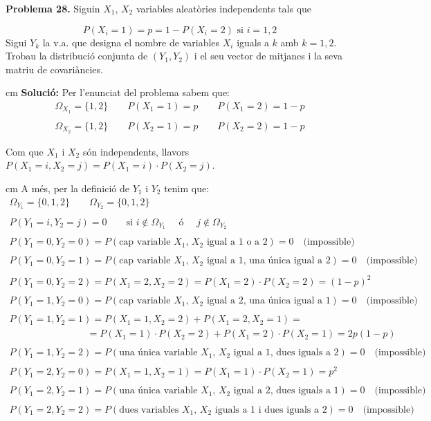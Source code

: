 \documentclass{article}
\begin{document}
\newpage
\noindent
\textbf{Problema 28.}  
Siguin $X_{1}$, $X_{2}$ variables aleat\`ories independents
tals que

$$P(X_{i}=1)=p=1-P(X_{i}=2) \mbox{ si } i=1,2$$ Sigui $Y_{k}$ la
v.a. que designa el nombre de variables $X_{i}$ iguals a $k$ amb
$k=1,2$. Trobau la distribuci\'o conjunta de $(Y_{1},Y_{2})$ i el
seu vector de mitjanes i la seva matriu de covari\`ancies.

 cm
\noindent
\textbf{Soluci\'o:} Per l'enunciat del problema sabem que:
\[
\begin{array}{l}
\Omega_{X_1}=\{ 1, 2 \} \qquad P(X_1=1)=p \qquad P(X_1=2)=1-p
\\
\\
\Omega_{X_2}=\{ 1, 2 \} \qquad P(X_2=1)=p \qquad P(X_2=2)=1-p
\end{array}
\]

\noindent
Com que $X_1$ i $X_2$ s\'on independents, llavors $P(X_1=i, X_2=j)=P(X_1=i) \cdot P(X_2=j)$.

 cm
\noindent
A m\'es, per la definici\'o de $Y_1$ i $Y_2$ tenim que:
\[
\begin{array}{l}
\Omega_{Y_1}=\{0, 1, 2\} \qquad \Omega_{Y_2}=\{0, 1, 2\} \\ \\
P(Y_1=i, Y_2=j) =0 \qquad \text{si } i \notin \Omega_{Y_1} \quad \text{ \'o } \quad j \notin \Omega_{Y_2} \\ \\
P(Y_1=0, Y_2=0) =P(\text{cap variable $X_1$, $X_2$ igual a 1 o a 2})=0 \quad \text{(impossible)} \\ \\
P(Y_1=0, Y_2=1) =P(\text{cap variable $X_1$, $X_2$ igual a 1, una \'unica igual a 2})=0 \quad \text{(impossible)} \\ \\
P(Y_1=0, Y_2=2) =P(X_1=2, X_2=2)=P(X_1=2) \cdot P(X_2=2)=(1-p)^2 \\ \\
P(Y_1=1, Y_2=0) =P(\text{cap variable $X_1$, $X_2$ igual a 2, una \'unica igual a 1})=0 \quad \text{(impossible)} \\ \\
P(Y_1=1, Y_2=1) =P(X_1=1, X_2=2)+P(X_1=2, X_2=1)= \\
\qquad \qquad \qquad  \qquad  =P(X_1=1) \cdot P(X_2=2) + P(X_1=2) \cdot P(X_2=1)= 2p(1-p) \\ \\
P(Y_1=1, Y_2=2) =P(\text{una \'unica variable $X_1$, $X_2$ igual a 1, dues iguals a 2})=0 \quad \text{(impossible)} \\ \\
P(Y_1=2, Y_2=0) =P(X_1=1, X_2=1)=P(X_1=1) \cdot P(X_2=1)=p^2 \\ \\
P(Y_1=2, Y_2=1) =P(\text{una \'unica variable $X_1$, $X_2$ igual a 2, dues iguals a 1})=0 \quad \text{(impossible)} \\ \\
P(Y_1=2, Y_2=2) =P(\text{dues variables $X_1$, $X_2$ iguals a 1 i dues iguals a 2})=0 \quad \text{(impossible)} 
\end{array}
\]
\end{document}
